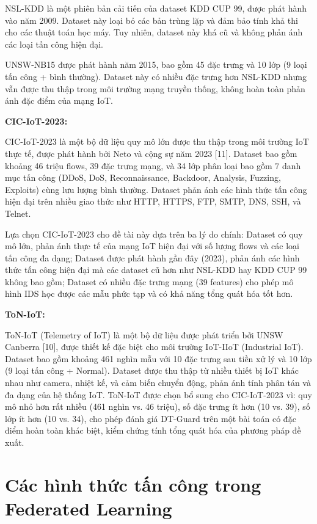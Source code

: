 NSL-KDD là một phiên bản cải tiến của dataset KDD CUP 99, được phát hành vào năm 2009. Dataset này loại bỏ các bản trùng lặp và đảm bảo tính khả thi cho các thuật toán học máy. Tuy nhiên, dataset này khá cũ và không phản ánh các loại tấn công hiện đại.

UNSW-NB15 được phát hành năm 2015, bao gồm 45 đặc trưng và 10 lớp (9 loại tấn công + bình thường). Dataset này có nhiều đặc trưng hơn NSL-KDD nhưng vẫn được thu thập trong môi trường mạng truyền thống, không hoàn toàn phản ánh đặc điểm của mạng IoT.

\textbf{CIC-IoT-2023:}

CIC-IoT-2023 là một bộ dữ liệu quy mô lớn được thu thập trong môi trường IoT thực tế, được phát hành bởi Neto và cộng sự năm 2023 {[}11{]}. Dataset bao gồm khoảng 46 triệu flows, 39 đặc trưng mạng, và 34 lớp phân loại bao gồm 7 danh mục tấn công (DDoS, DoS, Reconnaissance, Backdoor, Analysis, Fuzzing, Exploits) cùng lưu lượng bình thường. Dataset phản ánh các hình thức tấn công hiện đại trên nhiều giao thức như HTTP, HTTPS, FTP, SMTP, DNS, SSH, và Telnet.

Lựa chọn CIC-IoT-2023 cho đề tài này dựa trên ba lý do chính: Dataset có quy mô lớn, phản ánh thực tế của mạng IoT hiện đại với số lượng flows và các loại tấn công đa dạng; Dataset được phát hành gần đây (2023), phản ánh các hình thức tấn công hiện đại mà các dataset cũ hơn như NSL-KDD hay KDD CUP 99 không bao gồm; Dataset có nhiều đặc trưng mạng (39 features) cho phép mô hình IDS học được các mẫu phức tạp và có khả năng tổng quát hóa tốt hơn.

\textbf{ToN-IoT:}

ToN-IoT (Telemetry of IoT) là một bộ dữ liệu được phát triển bởi UNSW Canberra {[}10{]}, được thiết kế đặc biệt cho môi trường IoT-IIoT (Industrial IoT). Dataset bao gồm khoảng 461 nghìn mẫu với 10 đặc trưng sau tiền xử lý và 10 lớp (9 loại tấn công + Normal). Dataset được thu thập từ nhiều thiết bị IoT khác nhau như camera, nhiệt kế, và cảm biến chuyển động, phản ánh tính phân tán và đa dạng của hệ thống IoT. ToN-IoT được chọn bổ sung cho CIC-IoT-2023 vì: quy mô nhỏ hơn rất nhiều (461 nghìn vs. 46 triệu), số đặc trưng ít hơn (10 vs. 39), số lớp ít hơn (10 vs. 34), cho phép đánh giá DT-Guard trên một bài toán có đặc điểm hoàn toàn khác biệt, kiểm chứng tính tổng quát hóa của phương pháp đề xuất.

\section{Các hình thức tấn công trong Federated Learning}

